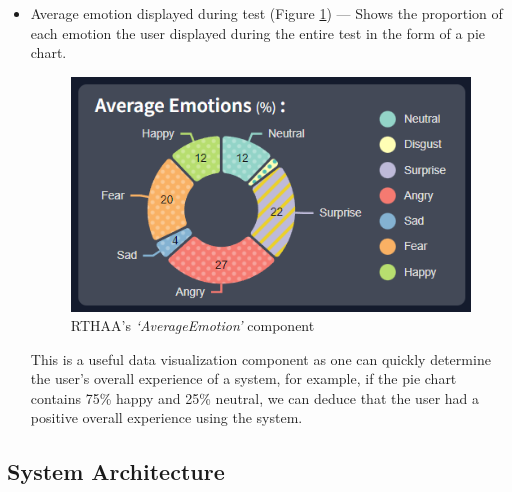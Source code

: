 \documentclass[12pt, a4paper]{article}
\begin{document}
\begin{itemize}
    \item Average emotion displayed during test (Figure \ref{fig:uic-pie}) --- Shows the proportion of each emotion the user displayed during the entire test in the form of a pie chart.
    \begin{figure}[H]
        \centering
        \includegraphics[scale=0.9]{images/uic-pie.png}
        \caption{RTHAA's \textit{`AverageEmotion'} component}
        \label{fig:uic-pie}
    \end{figure}

    This is a useful data visualization component as one can quickly determine the user's overall experience of a system, for example, if the pie chart contains 75\% happy and 25\% neutral, we can deduce that the user had a positive overall experience using the system.

\end{itemize}

\subsection{System Architecture}
\label{sysarch}




\end{document}
